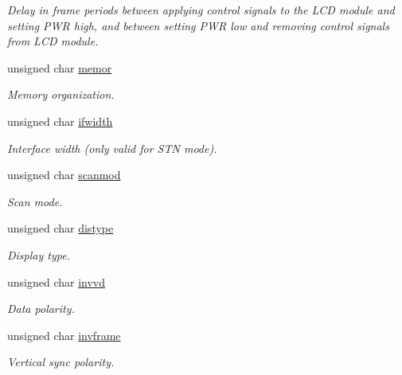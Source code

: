 \begin{CompactItemize}
\begin{CompactList}\small\item\em Delay in frame periods between applying control signals to the LCD module and setting PWR high, and between setting PWR low and removing control signals from LCD module. \item\end{CompactList}\item 
unsigned char \hyperlink{structlcdc__configuration__s_1f7b0da117a8f440c6073a09b8e22ab8}{memor}
\begin{CompactList}\small\item\em Memory organization. \item\end{CompactList}\item 
unsigned char \hyperlink{structlcdc__configuration__s_17aee7070ad85eab6da7f46c638de72a}{ifwidth}
\begin{CompactList}\small\item\em Interface width (only valid for STN mode). \item\end{CompactList}\item 
unsigned char \hyperlink{structlcdc__configuration__s_e208162dfd1fd4be065ae86243fbf1f0}{scanmod}
\begin{CompactList}\small\item\em Scan mode. \item\end{CompactList}\item 
unsigned char \hyperlink{structlcdc__configuration__s_dad6838254de608ddf7a52b687b5a89a}{distype}
\begin{CompactList}\small\item\em Display type. \item\end{CompactList}\item 
unsigned char \hyperlink{structlcdc__configuration__s_0b8a7d6d1459c92c2f675506a203deb8}{invvd}
\begin{CompactList}\small\item\em Data polarity. \item\end{CompactList}\item 
unsigned char \hyperlink{structlcdc__configuration__s_c5fc90d8386ff108dccda3269f936ea0}{invframe}
\begin{CompactList}\small\item\em Vertical sync polarity. \item\end{CompactList}\item 

\end{CompactItemize}
